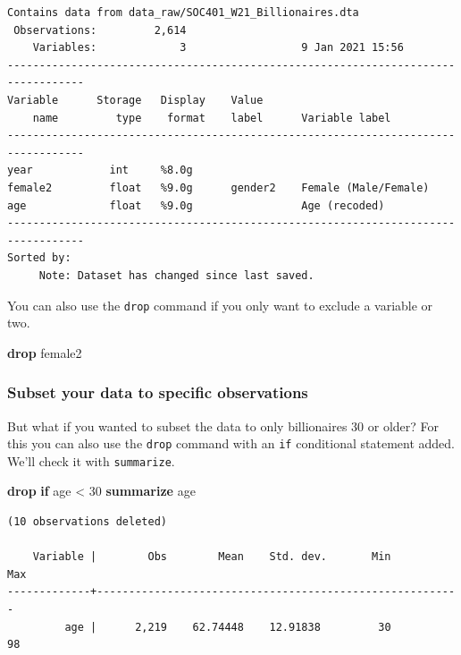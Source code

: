 \documentclass[
]{book}
\newenvironment{Shaded}{\begin{snugshade}}{\end{snugshade}}
\newcommand{\KeywordTok}[1]{\textcolor[rgb]{0.13,0.29,0.53}{\textbf{#1}}}
\newcommand{\NormalTok}[1]{#1}
\begin{document}
\begin{verbatim}
Contains data from data_raw/SOC401_W21_Billionaires.dta
 Observations:         2,614                  
    Variables:             3                  9 Jan 2021 15:56
----------------------------------------------------------------------------------
Variable      Storage   Display    Value
    name         type    format    label      Variable label
----------------------------------------------------------------------------------
year            int     %8.0g                 
female2         float   %9.0g      gender2    Female (Male/Female)
age             float   %9.0g                 Age (recoded)
----------------------------------------------------------------------------------
Sorted by: 
     Note: Dataset has changed since last saved.
\end{verbatim}

You can also use the \texttt{drop} command if you only want to exclude a variable or two.

\begin{Shaded}
\begin{Highlighting}[]
\KeywordTok{drop}\NormalTok{ female2}
\end{Highlighting}
\end{Shaded}

\hypertarget{dropif}{%
\subsubsection*{Subset your data to specific observations}\label{dropif}}

But what if you wanted to subset the data to only billionaires 30 or older? For this you can also use the \texttt{drop} command with an \texttt{if} conditional statement added. We'll check it with \texttt{summarize}.

\begin{Shaded}
\begin{Highlighting}[]
\KeywordTok{drop} \KeywordTok{if}\NormalTok{ age \textless{} 30 }
\KeywordTok{summarize}\NormalTok{ age }
\end{Highlighting}
\end{Shaded}

\begin{verbatim}
(10 observations deleted)

    Variable |        Obs        Mean    Std. dev.       Min        Max
-------------+---------------------------------------------------------
         age |      2,219    62.74448    12.91838         30         98
\end{verbatim}
\end{document}
